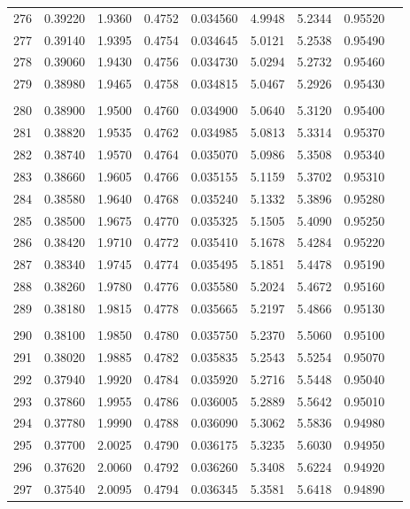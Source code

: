 \documentclass[letter,twosides,10pt]{article}
\begin{document}
\begin{longtable}{|c|c|c|c|c|c|c|c|c|}
276 & 0.39220 & 1.9360 & 0.4752 & 0.034560 & 4.9948 &  5.2344 & 0.95520 \\
277 & 0.39140 & 1.9395 & 0.4754 & 0.034645 & 5.0121 &  5.2538 & 0.95490 \\
278 & 0.39060 & 1.9430 & 0.4756 & 0.034730 & 5.0294 &  5.2732 & 0.95460 \\
279 & 0.38980 & 1.9465 & 0.4758 & 0.034815 & 5.0467 &  5.2926 & 0.95430 \\
 & & & & & & & \\
280 & 0.38900 & 1.9500 & 0.4760 & 0.034900 & 5.0640 &  5.3120 & 0.95400 \\
281 & 0.38820 & 1.9535 & 0.4762 & 0.034985 & 5.0813 &  5.3314 & 0.95370 \\
282 & 0.38740 & 1.9570 & 0.4764 & 0.035070 & 5.0986 &  5.3508 & 0.95340 \\
283 & 0.38660 & 1.9605 & 0.4766 & 0.035155 & 5.1159 &  5.3702 & 0.95310 \\
284 & 0.38580 & 1.9640 & 0.4768 & 0.035240 & 5.1332 &  5.3896 & 0.95280 \\
285 & 0.38500 & 1.9675 & 0.4770 & 0.035325 & 5.1505 &  5.4090 & 0.95250 \\
286 & 0.38420 & 1.9710 & 0.4772 & 0.035410 & 5.1678 &  5.4284 & 0.95220 \\
287 & 0.38340 & 1.9745 & 0.4774 & 0.035495 & 5.1851 &  5.4478 & 0.95190 \\
288 & 0.38260 & 1.9780 & 0.4776 & 0.035580 & 5.2024 &  5.4672 & 0.95160 \\
289 & 0.38180 & 1.9815 & 0.4778 & 0.035665 & 5.2197 &  5.4866 & 0.95130 \\
 & & & & & & & \\
290 & 0.38100 & 1.9850 & 0.4780 & 0.035750 & 5.2370 &  5.5060 & 0.95100 \\
291 & 0.38020 & 1.9885 & 0.4782 & 0.035835 & 5.2543 &  5.5254 & 0.95070 \\
292 & 0.37940 & 1.9920 & 0.4784 & 0.035920 & 5.2716 &  5.5448 & 0.95040 \\
293 & 0.37860 & 1.9955 & 0.4786 & 0.036005 & 5.2889 &  5.5642 & 0.95010 \\
294 & 0.37780 & 1.9990 & 0.4788 & 0.036090 & 5.3062 &  5.5836 & 0.94980 \\
295 & 0.37700 & 2.0025 & 0.4790 & 0.036175 & 5.3235 &  5.6030 & 0.94950 \\
296 & 0.37620 & 2.0060 & 0.4792 & 0.036260 & 5.3408 &  5.6224 & 0.94920 \\
297 & 0.37540 & 2.0095 & 0.4794 & 0.036345 & 5.3581 &  5.6418 & 0.94890 \\

\end{longtable}
\end{document}

